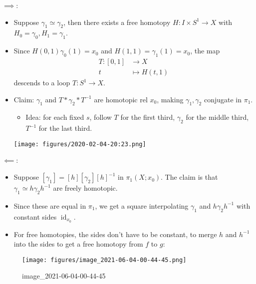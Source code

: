 \begin{solution}

\hfill

\(\implies\):

\begin{itemize}
\tightlist
\item
  Suppose \(\gamma_1 \simeq\gamma_2\), then there exists a free homotopy
  \(H: I\times S^1 \to X\) with \(H_0 = \gamma_0, H_1 = \gamma_1\).
\item
  Since \(H(0, 1) \gamma_0(1) = x_0\) and
  \(H(1, 1) = \gamma_1(1) = x_0\), the map
  \begin{align*}
  T: [0, 1] &\to X \\
  t &\mapsto H(t, 1)
  \end{align*}
  descends to a loop \(T:S^1\to X\).
\item
  Claim: \(\gamma_1\) and \(T\ast \gamma_2 \ast T^{-1}\) are homotopic
  rel \(x_0\), making \(\gamma_1, \gamma_2\) conjugate in \(\pi_1\).

  \begin{itemize}
  \tightlist
  \item
    Idea: for each fixed \(s\), follow \(T\) for the first third,
    \(\gamma_2\) for the middle third, \(T^{-1}\) for the last third.
  \end{itemize}

  \texttt{[image: figures/2020-02-04-20:23.png]}
\end{itemize}

\(\impliedby\):

\begin{itemize}
\tightlist
\item
  Suppose \([\gamma_1] = [h] [\gamma_2] [h]^{-1}\) in \(\pi_1(X; x_0)\).
  The claim is that \(\gamma_1 \simeq h\gamma_2 h^{-1}\) are freely
  homotopic.
\item
  Since these are equal in \(\pi_1\), we get a square interpolating
  \(\gamma_1\) and \(h\gamma_2 h^{-1}\) with constant sides
  \(\operatorname{id}_{x_0}\).
\item
  For free homotopies, the sides don't have to be constant, to merge
  \(h\) and \(h^{-1}\) into the sides to get a free homotopy from \(f\)
  to \(g\):
\end{itemize}

\begin{figure}
\centering
\texttt{[image: figures/image\_2021-06-04-00-44-45.png]}
\caption{image\_2021-06-04-00-44-45}
\end{figure}

\end{solution}

